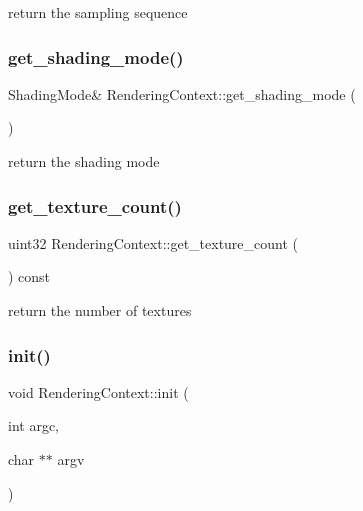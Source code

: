 return the sampling sequence \mbox{\label{struct_rendering_context_afd87e30ef95fae1e1000ac2a9f989432}} 
\subsubsection{\texorpdfstring{get\+\_\+shading\+\_\+mode()}{get\_shading\_mode()}}
{\footnotesize\ttfamily Shading\+Mode\& Rendering\+Context\+::get\+\_\+shading\+\_\+mode (\begin{DoxyParamCaption}{ }\end{DoxyParamCaption})}

return the shading mode \mbox{\label{struct_rendering_context_ae4df60bbe57452d7b359501bfc4f2c8c}} 
\subsubsection{\texorpdfstring{get\+\_\+texture\+\_\+count()}{get\_texture\_count()}}
{\footnotesize\ttfamily uint32 Rendering\+Context\+::get\+\_\+texture\+\_\+count (\begin{DoxyParamCaption}{ }\end{DoxyParamCaption}) const}

return the number of textures \mbox{\label{struct_rendering_context_a5ca766a70c2def1699f2ed6fa1f8bccd}} 
\subsubsection{\texorpdfstring{init()}{init()}}
{\footnotesize\ttfamily void Rendering\+Context\+::init (\begin{DoxyParamCaption}\item[{int}]{argc,  }\item[{char $\ast$$\ast$}]{argv }\end{DoxyParamCaption})}

